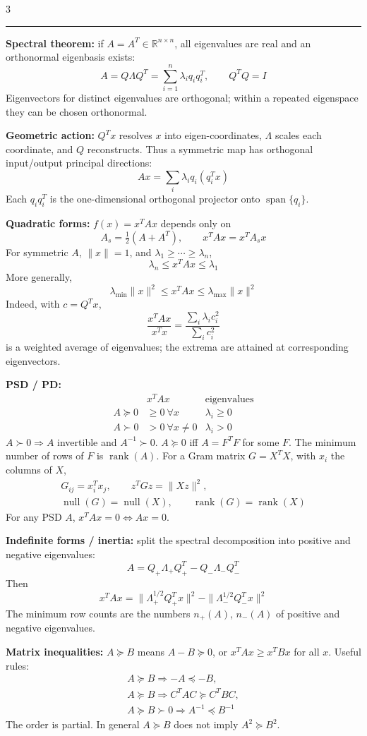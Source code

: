 \documentclass[10pt]{article}
\newcommand{\sect}[1]{\vspace{0.9pt}{\fontsize{7.2}{7.5}\selectfont\textbf{#1}}\vspace{0.25pt}\hrule\vspace{0.8pt}}
\newcommand{\sub}[1]{\textbf{#1}}
\newcommand{\R}{\mathbb{R}}
\newcommand{\rank}{\operatorname{rank}}
\newcommand{\nullsp}{\operatorname{null}}
\newcommand{\spn}{\operatorname{span}}
\begin{document}
\begin{multicols*}{3}
\sect{Symmetric Matrices (Lecture 14)}
\sub{Spectral theorem:} if \(A=A^T\in\R^{n\times n}\), all eigenvalues are
real and an orthonormal eigenbasis exists:
\[
A=Q\Lambda Q^T=\sum_{i=1}^n\lambda_iq_iq_i^T,\qquad Q^TQ=I
\]
Eigenvectors for distinct eigenvalues are orthogonal; within a repeated
eigenspace they can be chosen orthonormal.

\sub{Geometric action:} \(Q^Tx\) resolves \(x\) into eigen-coordinates,
\(\Lambda\) scales each coordinate, and \(Q\) reconstructs. Thus a
symmetric map has orthogonal input/output principal directions:
\[
Ax=\sum_i\lambda_iq_i(q_i^Tx)
\]
Each \(q_iq_i^T\) is the one-dimensional orthogonal projector onto
\(\spn\{q_i\}\).

\sub{Quadratic forms:} \(f(x)=x^TAx\) depends only on
\[
A_s=\tfrac12(A+A^T),\qquad x^TAx=x^TA_sx
\]
For symmetric \(A\), \(\|x\|=1\), and
\(\lambda_1\ge\cdots\ge\lambda_n\),
\[
\lambda_n\le x^TAx\le\lambda_1
\]
More generally,
\[
\lambda_{\min}\|x\|^2\le x^TAx\le\lambda_{\max}\|x\|^2
\]
Indeed, with \(c=Q^Tx\),
\[
\frac{x^TAx}{x^Tx}=\frac{\sum_i\lambda_i c_i^2}{\sum_i c_i^2}
\]
is a weighted average of eigenvalues; the extrema are attained at
corresponding eigenvectors.

\sub{PSD / PD:}
\[
\begin{array}{c|c|c}
 &x^TAx&\text{eigenvalues}\\ \hline
A\succeq0&\ge0\ \forall x&\lambda_i\ge0\\
A\succ0&>0\ \forall x\ne0&\lambda_i>0
\end{array}
\]
\(A\succ0\Rightarrow A\) invertible and \(A^{-1}\succ0\).
\(A\succeq0\) iff \(A=F^TF\) for some \(F\). The minimum number of rows
of \(F\) is \(\rank(A)\).
For a Gram matrix \(G=X^TX\), with \(x_i\) the columns of \(X\),
\[
\begin{gathered}
G_{ij}=x_i^Tx_j,\qquad z^TGz=\|Xz\|^2,\\
\nullsp(G)=\nullsp(X),\qquad\rank(G)=\rank(X)
\end{gathered}
\]
For any PSD \(A\), \(x^TAx=0\iff Ax=0\).

\sub{Indefinite forms / inertia:} split the spectral decomposition into
positive and negative eigenvalues:
\[
A=Q_+\Lambda_+Q_+^T-Q_-\Lambda_-Q_-^T
\]
Then
\[
x^TAx=\|\Lambda_+^{1/2}Q_+^Tx\|^2-
\|\Lambda_-^{1/2}Q_-^Tx\|^2
\]
The minimum row counts are the numbers \(n_+(A)\), \(n_-(A)\) of positive
and negative eigenvalues.

\sub{Matrix inequalities:} \(A\succeq B\) means \(A-B\succeq0\), or
\(x^TAx\ge x^TBx\) for all \(x\). Useful rules:
\[
\begin{gathered}
A\succeq B\Rightarrow -A\preceq-B,\\
A\succeq B\Rightarrow C^TAC\succeq C^TBC,\\
A\succeq B\succ0\Rightarrow A^{-1}\preceq B^{-1}
\end{gathered}
\]
The order is partial. In general \(A\succeq B\) does not imply
\(A^2\succeq B^2\).


\end{multicols*}
\end{document}
